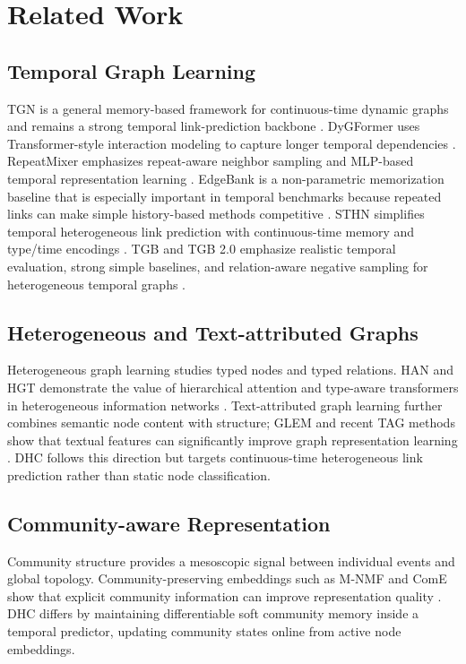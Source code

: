 \documentclass[runningheads]{llncs}
\begin{document}
\section{Related Work}
\subsection{Temporal Graph Learning}
TGN is a general memory-based framework for continuous-time dynamic graphs and remains a strong temporal link-prediction backbone \cite{rossi2020tgn}. DyGFormer uses Transformer-style interaction modeling to capture longer temporal dependencies \cite{yu2023dygformer}. RepeatMixer emphasizes repeat-aware neighbor sampling and MLP-based temporal representation learning \cite{zou2024repeatmixer}. EdgeBank is a non-parametric memorization baseline that is especially important in temporal benchmarks because repeated links can make simple history-based methods competitive \cite{huang2023tgb}. STHN simplifies temporal heterogeneous link prediction with continuous-time memory and type/time encodings \cite{li2023sthn}. TGB and TGB 2.0 emphasize realistic temporal evaluation, strong simple baselines, and relation-aware negative sampling for heterogeneous temporal graphs \cite{huang2023tgb,gastinger2024tgb2}.

\subsection{Heterogeneous and Text-attributed Graphs}
Heterogeneous graph learning studies typed nodes and typed relations. HAN and HGT demonstrate the value of hierarchical attention and type-aware transformers in heterogeneous information networks \cite{wang2019han,hu2020hgt}. Text-attributed graph learning further combines semantic node content with structure; GLEM and recent TAG methods show that textual features can significantly improve graph representation learning \cite{zhao2023glem,zhou2025sketch}. DHC follows this direction but targets continuous-time heterogeneous link prediction rather than static node classification.

\subsection{Community-aware Representation}
Community structure provides a mesoscopic signal between individual events and global topology. Community-preserving embeddings such as M-NMF and ComE show that explicit community information can improve representation quality \cite{wang2017mnmf,cavallari2017come}. DHC differs by maintaining differentiable soft community memory inside a temporal predictor, updating community states online from active node embeddings.
\end{document}
